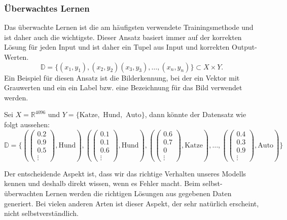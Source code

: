 \documentclass[12pt,letterpaper,ngerman]{article}
\begin{document}
\subsubsection{Überwachtes Lernen}
Das überwachte Lernen ist die am häufigsten verwendete Trainingsmethode
und ist daher auch die wichtigste. Dieser Ansatz basiert immer auf der
korrekten Lösung für jeden Input und ist daher ein Tupel aus Input und
korrekten Output-Werten. 
  \[\mathbb{D} = \{ (x_1,y_1), (x_2,y_2) (x_3,y_3), \dots ,(x_n,y_n)\} 
  \subset X \times Y.\]
Ein Beispiel für diesen Ansatz ist die Bilderkennung, bei der ein Vektor
mit Grauwerten und ein ein Label bzw. eine Bezeichnung für das Bild
verwendet werden.
\begin{example}
  Sei $X = \mathbb{R}^{4096}$ und
   $Y = \{ \text{Katze}, \text{ Hund}, \text{ Auto}\}$, dann könnte der 
   Datensatz wie folgt aussehen:
   \[
     \mathbb{D} = \{
     (\begin{pmatrix} 0.2 \\ 0.9 \\ 0.5 \\ \vdots \end{pmatrix}, \text{Hund}),
     (\begin{pmatrix} 0.1 \\ 0.1 \\ 0.6 \\ \vdots \end{pmatrix}, \text{Hund}),
     (\begin{pmatrix} 0.6 \\ 0.7 \\ 0 \\ \vdots \end{pmatrix}, \text{Katze}),
     \dots, 
     (\begin{pmatrix} 0.4 \\ 0.3 \\ 0.9 \\ \vdots \end{pmatrix}, \text{Auto})
    \}
   \]
\end{example}
Der entscheidende Aspekt ist, dass wir das richtige Verhalten unseres Modells 
kennen und deshalb direkt wissen, wenn es Fehler macht. Beim selbst-überwachten
Lernen werden die richtigen Lösungen aus gegebenen Daten generiert. 
Bei vielen anderen Arten ist dieser Aspekt, der sehr natürlich erscheint,
nicht selbstverständlich.
\end{document}
